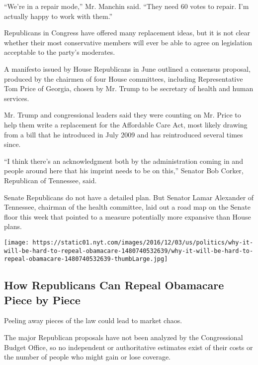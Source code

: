 ``We're in a repair mode,'' Mr. Manchin said. ``They need 60 votes to
repair. I'm actually happy to work with them.''

Republicans in Congress have offered many replacement ideas, but it is
not clear whether their most conservative members will ever be able to
agree on legislation acceptable to the party's moderates.

A manifesto issued by House Republicans in June outlined a consensus
proposal, produced by the chairmen of four House committees, including
Representative Tom Price of Georgia, chosen by Mr. Trump to be secretary
of health and human services.

Mr. Trump and congressional leaders said they were counting on Mr. Price
to help them write a replacement for the Affordable Care Act, most
likely drawing from a bill that he introduced in July 2009 and has
reintroduced several times since.

``I think there's an acknowledgment both by the administration coming in
and people around here that his imprint needs to be on this,'' Senator
Bob Corker, Republican of Tennessee, said.

Senate Republicans do not have a detailed plan. But Senator Lamar
Alexander of Tennessee, chairman of the health committee, laid out a
road map on the Senate floor this week that pointed to a measure
potentially more expansive than House plans.

\href{https://www.nytimes.com/interactive/2016/12/03/us/politics/why-it-will-be-hard-to-repeal-obamacare.html}{}

\texttt{[image: https://static01.nyt.com/images/2016/12/03/us/politics/why-it-will-be-hard-to-repeal-obamacare-1480740532639/why-it-will-be-hard-to-repeal-obamacare-1480740532639-thumbLarge.jpg]}

\hypertarget{how-republicans-can-repeal-obamacare-piece-by-piece}{%
\subsection{How Republicans Can Repeal Obamacare Piece by
Piece}\label{how-republicans-can-repeal-obamacare-piece-by-piece}}

Peeling away pieces of the law could lead to market chaos.

The major Republican proposals have not been analyzed by the
Congressional Budget Office, so no independent or authoritative
estimates exist of their costs or the number of people who might gain or
lose coverage.

